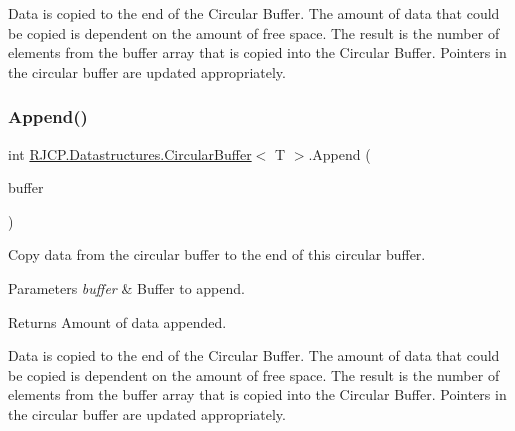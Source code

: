 Data is copied to the end of the Circular Buffer. The amount of data that could be copied is dependent on the amount of free space. The result is the number of elements from the {\ttfamily buffer} array that is copied into the Circular Buffer. Pointers in the circular buffer are updated appropriately. \mbox{\label{class_r_j_c_p_1_1_datastructures_1_1_circular_buffer_ae9728a92333805eaaaae6945078a4ad4}} 
\subsubsection{\texorpdfstring{Append()}{Append()}\hspace{0.1cm}{\footnotesize\ttfamily [3/6]}}
{\footnotesize\ttfamily int \mbox{\hyperlink{class_r_j_c_p_1_1_datastructures_1_1_circular_buffer}{R\+J\+C\+P.\+Datastructures.\+Circular\+Buffer}}$<$ T $>$.Append (\begin{DoxyParamCaption}\item[{\mbox{\hyperlink{class_r_j_c_p_1_1_datastructures_1_1_circular_buffer}{Circular\+Buffer}}$<$ T $>$}]{buffer }\end{DoxyParamCaption})}



Copy data from the circular buffer to the end of this circular buffer. 


\begin{DoxyParams}{Parameters}
{\em buffer} & Buffer to append.\\
\hline
\end{DoxyParams}
\begin{DoxyReturn}{Returns}
Amount of data appended.
\end{DoxyReturn}


Data is copied to the end of the Circular Buffer. The amount of data that could be copied is dependent on the amount of free space. The result is the number of elements from the {\ttfamily buffer} array that is copied into the Circular Buffer. Pointers in the circular buffer are updated appropriately. \mbox{\label{class_r_j_c_p_1_1_datastructures_1_1_circular_buffer_a92a93e7c9c188cdf8bce6f5c1d3f691b}} 
